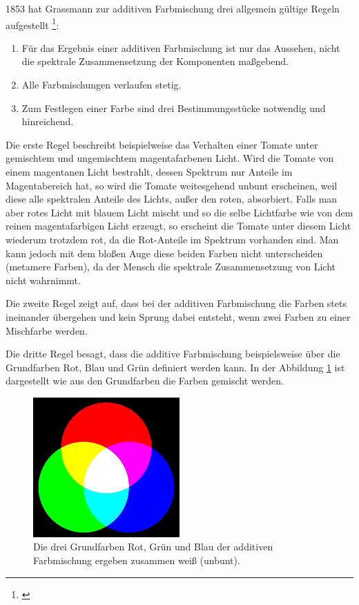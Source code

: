 1853 hat Grassmann zur additiven Farbmischung drei allgemein gültige Regeln aufgestellt \footnote{\cite[105]{hentschel}}: 
\newpage
\begin{enumerate}\setlength{\itemsep}{0ex}
\item Für das Ergebnis einer additiven Farbmischung ist nur das Aussehen, nicht die spektrale Zusammensetzung der Komponenten maßgebend.
\item Alle Farbmischungen verlaufen stetig.
\item Zum Festlegen einer Farbe sind drei Bestimmungsstücke notwendig und hinreichend.
\end{enumerate}

Die erste Regel beschreibt beispielweise das Verhalten einer Tomate unter gemischtem und ungemischtem magentafarbenen Licht. Wird die Tomate von einem magentanen Licht bestrahlt, dessen Spektrum nur Anteile im Magentabereich hat, so wird die Tomate weitesgehend unbunt erscheinen, weil diese alle spektralen Anteile des Lichts, außer den roten, absorbiert. Falls man aber rotes Licht mit blauem Licht mischt und so die selbe Lichtfarbe wie von dem reinen magentafarbigen Licht erzeugt, so erscheint die Tomate unter diesem Licht wiederum trotzdem rot, da die Rot-Anteile im Spektrum vorhanden sind. Man kann jedoch mit dem bloßen Auge diese beiden Farben nicht unterscheiden (metamere Farben), da der Mensch die spektrale Zusammensetzung von Licht nicht wahrnimmt. 

Die zweite Regel zeigt auf, dass bei der additiven Farbmischung die Farben stets ineinander übergehen und kein Sprung dabei entsteht, wenn zwei Farben zu einer Mischfarbe werden.

Die dritte Regel besagt, dass die additive Farbmischung beispielsweise über die Grundfarben Rot, Blau und Grün definiert werden kann. In der Abbildung   \ref{b_farben+} ist dargestellt wie aus den Grundfarben die Farben gemischt werden.

\begin{figure}[H]     %
\centering
\includegraphics[width=0.5\textwidth]{bilder/farben+} 
\caption {Die drei Grundfarben Rot, Grün und Blau der additiven Farbmischung ergeben zusammen weiß (unbunt).\protect\footnotemark}\label{b_farben+}
\end{figure}

